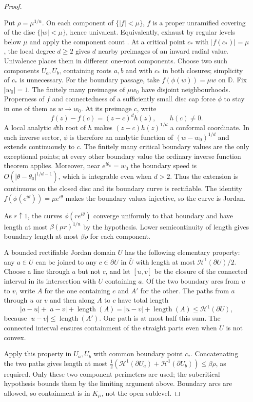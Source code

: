 \begin{proof}
\hypertarget{perimeter-to-path}{}
Put $\rho=\mu^{1/n}$. On each component of $\{|f|<\mu\}$,
$f$ is a proper unramified covering of the disc $\{|w|<\mu\}$, hence
univalent. Equivalently, exhaust by regular levels below $\mu$ and apply
the component count \cite[proof of Proposition~2.1]{eks2010}.
At a critical point $c_*$ with
$|f(c_*)|=\mu$, the local degree $d\ge2$ gives $d$ nearby preimages of
an inward radial value. Univalence places them in different one-root
components. Choose two such components $U_a,U_b$, containing roots $a,b$
and with $c_*$ in both closures; simplicity of $c_*$ is unnecessary.
For the boundary passage, take $f(\phi(w))=\mu w$ on $\mathbb D$.
Fix $|w_0|=1$. The finitely many preimages of $\mu w_0$ have disjoint
neighbourhoods. Properness of $f$ and connectedness of a sufficiently
small disc cap force $\phi$ to stay in one of them as $w\to w_0$.
At its preimage $c$, write
\[
 f(z)-f(c)=(z-c)^d h(z),\qquad h(c)\ne0.
\]
A local analytic $d$th root of $h$ makes $(z-c)h(z)^{1/d}$ a conformal
coordinate. In each inverse sector, $\phi$ is therefore an analytic
function of $(w-w_0)^{1/d}$ and extends continuously to $c$.
The finitely many critical boundary values are the only exceptional
points; at every other boundary value the ordinary inverse function
theorem applies. Moreover, near $e^{i\theta_0}=w_0$ the boundary
speed is $O(|\theta-\theta_0|^{1/d-1})$, which is integrable even when
$d>2$. Thus the extension is continuous on the closed disc and its
boundary curve is rectifiable. The identity
$f(\phi(e^{i\theta}))=\mu e^{i\theta}$ makes the boundary values injective,
so the curve is Jordan.

As $r\uparrow1$, the curves $\phi(re^{i\theta})$ converge uniformly to
that boundary and have length at most $\beta(\mu r)^{1/n}$ by the
hypothesis. Lower semicontinuity of length gives boundary length at most
$\beta\rho$ for each component.

A bounded rectifiable Jordan domain $U$ has the following elementary
property: any $a\in U$ can be joined to any $c\in\partial U$ in
$\overline U$ with length at most $\mathcal H^1(\partial U)/2$.
Choose a line through $a$ but not $c$, and let $[u,v]$ be the closure
of the connected interval in its intersection with $U$ containing $a$.
Of the two boundary arcs from $u$ to $v$, write $A$ for the one containing
$c$ and $A'$ for the other. The paths from $a$ through $u$ or $v$ and
then along $A$ to $c$ have total length
\[
 |a-u|+|a-v|+\operatorname{length}(A)
 =|u-v|+\operatorname{length}(A)
 \le\mathcal H^1(\partial U),
\]
because $|u-v|\le\operatorname{length}(A')$. One path is at most half
this sum. The connected interval ensures containment of the straight
parts even when $U$ is not convex.

Apply this property in $U_a,U_b$ with common boundary point $c_*$.
Concatenating the two paths gives length at most
$\tfrac12(\mathcal H^1(\partial U_a)+\mathcal H^1(\partial U_b))
\le\beta\rho$, as required.
Only these two component perimeters are used; the subcritical hypothesis
bounds them by the limiting argument above. Boundary arcs are allowed,
so containment is in $K_\mu$, not the open sublevel.
\end{proof}

